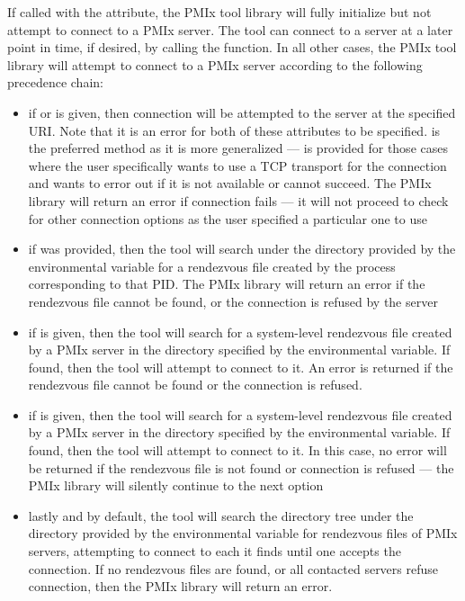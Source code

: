 If called with the  attribute, the \ac{PMIx} tool library will fully initialize but not attempt to connect to a \ac{PMIx} server. The tool can connect to a server at a later point in time, if desired, by calling the  function. In all other cases, the \ac{PMIx} tool library will attempt to connect to a \ac{PMIx} server according to the following precedence chain:

\begin{itemize}
    \item if  or  is given, then connection will be attempted to the server at the specified \ac{URI}. Note that it is an error for both of these attributes to be specified.  is the preferred method as it is more generalized ---  is provided for those cases where the user specifically wants to use a TCP transport for the connection and wants to error out if it is not available or cannot succeed. The \ac{PMIx} library will return an error if connection fails --- it will not proceed to check for other connection options as the user specified a particular one to use
    \item if  was provided, then the tool will search under the directory provided by the  environmental variable for a rendezvous file created by the process corresponding to that \ac{PID}. The \ac{PMIx} library will return an error if the rendezvous file cannot be found, or the connection is refused by the server
    \item if  is given, then the tool will search for a system-level rendezvous file created by a \ac{PMIx} server in the directory specified by the  environmental variable. If found, then the tool will attempt to connect to it. An error is returned if the rendezvous file cannot be found or the connection is refused.
    \item if  is given, then the tool will search for a system-level rendezvous file created by a \ac{PMIx} server in the directory specified by the  environmental variable. If found, then the tool will attempt to connect to it. In this case, no error will be returned if the rendezvous file is not found or connection is refused --- the \ac{PMIx} library will silently continue to the next option
    \item lastly and by default, the tool will search the directory tree under the directory provided by the  environmental variable for rendezvous files of \ac{PMIx} servers, attempting to connect to each it finds until one accepts the connection. If no rendezvous files are found, or all contacted servers refuse connection, then the \ac{PMIx} library will return an error.
\end{itemize}

